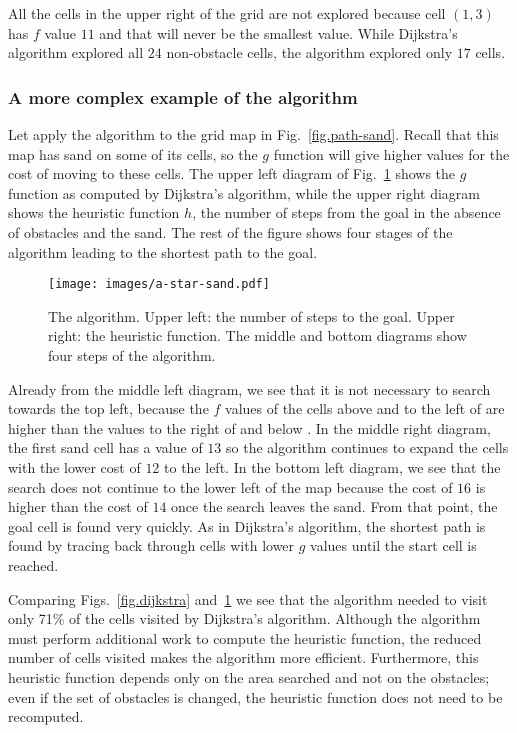 All the cells in the upper right of the grid are not explored because cell $(1,3)$ has $f$ value $11$ and that will never be the smallest value. While Dijkstra's algorithm explored all $24$ non-obstacle cells, the \astar{} algorithm explored only $17$ cells.

\subsubsection*{A more complex example of the \astar{} algorithm}

Let apply the \astar{} algorithm to the grid map in Fig.~\ref{fig.path-sand}. Recall that this map has sand on some of its cells, so the $g$ function will give higher values for the cost of moving to these cells. The upper left diagram of Fig.~\ref{fig.a-star} shows the $g$ function as computed by Dijkstra's algorithm, while the upper right diagram shows the heuristic function $h$, the number of steps from the goal in the absence of obstacles and the sand. The rest of the figure shows four stages of the algorithm leading to the shortest path to the goal.

\begin{figure}
\begin{center}
\texttt{[image: images/a-star-sand.pdf]}
\end{center}
\caption{The \astar{} algorithm. Upper left: the number of steps to the goal. Upper right: the heuristic function. The middle and bottom diagrams show four steps of the algorithm.}\label{fig.a-star}
\end{figure}

Already from the middle left diagram, we see that it is not necessary to search towards the top left, because the $f$ values of the cells above and to the left of  are higher than the values to the right of and below . In the middle right diagram, the first sand cell has a value of $13$ so the algorithm continues to expand the cells with the lower cost of $12$ to the left. In the bottom left diagram, we see that the search does not continue to the lower left of the map because the cost of $16$ is higher than the cost of $14$ once the search leaves the sand. From that point, the goal cell  is found very quickly. As in Dijkstra's algorithm, the shortest path is found by tracing back through cells with lower $g$ values until the start cell is reached.

Comparing Figs.~\ref{fig.dijkstra} and~\ref{fig.a-star} we see that the \astar{} algorithm needed to visit only 71\% of the cells visited by Dijkstra's algorithm. Although the \astar{} algorithm must perform additional work to compute the heuristic function, the reduced number of cells visited makes the algorithm more efficient. Furthermore, this heuristic function depends only on the area searched and not on the obstacles; even if the set of obstacles is changed, the heuristic function does not need to be recomputed.

